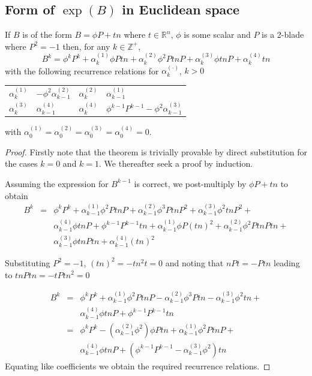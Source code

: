 \subsection{Form of $\exp(B)$ in Euclidean space}
\label{subsec:form}

\begin{lemma}
\label{lem:bk}
If $B$ is of the form $B=\phi P+tn$ where 
$t \in \mathbb{R}^n$, $\phi$ is some scalar and $P$ is a 2-blade 
where $P^2 = -1$ then, for any $k \in \mathbb{Z}^+$, 
\[
B^{k}=\phi^k P^{k}+\alpha _{k}^{(1)}\phi Ptn+
\alpha _{k}^{(2)}\phi^2 PtnP+\alpha _{k}^{(3)}\phi tnP+\alpha _{k}^{(4)}tn
\]
with the following recurrence relations for $\alpha _{k}^{(\cdot )}$,
$k>0$ 

\begin{centering}

\begin{tabular}{r@{$\ =\ $}lr@{$\ =\ $}l}
$\alpha _{k}^{(1)}$ & $- \phi^2 \alpha _{k-1}^{(2)}$ &
$\alpha _{k}^{(2)}$ & $\alpha _{k-1}^{(1)}$\\
$\alpha _{k}^{(3)}$ & $\alpha _{k-1}^{(4)}$ &
$\alpha _{k}^{(4)}$ & $\phi^{k-1}P^{k-1} - \phi^2 \alpha_{k-1}^{(3)}$
\end{tabular}

\end{centering}

\noindent with 
$\alpha _{0}^{(1)}=\alpha _{0}^{(2)}=
\alpha _{0}^{(3)}=\alpha _{0}^{(4)}=0$.
\end{lemma}
\begin{proof}
Firstly note that the theorem is trivially provable by direct 
substitution for the cases $k=0$ and $k=1$. We thereafter seek a 
proof by induction.

Assuming the expression for $B^{k-1}$ is correct, we post-multiply
by $\phi P+tn$ to obtain
\begin{eqnarray*}
B^k & = & \phi^k P^k + \alpha_{k-1}^{(1)}\phi^2 PtnP + 
          \alpha_{k-1}^{(2)}\phi^3 PtnP^2 + \alpha_{k-1}^{(3)}\phi^2 tnP^2 + \\
    &   & \alpha_{k-1}^{(4)}\phi tnP + \phi^{k-1} P^{k-1} tn + \alpha_{k-1}^{(1)}\phi P(tn)^2 +
          \alpha_{k-1}^{(2)}\phi^2 PtnPtn + \\
    &   & \alpha_{k-1}^{(3)}\phi tnPtn +
	  \alpha_{k-1}^{(4)}(tn)^2
\end{eqnarray*}

Substituting $P^2 = -1$, $(tn)^2 = - tn^2t = 0$ and noting that
$nPt = - Ptn$ leading to $tnPtn = - tPtn^2 = 0$

\begin{eqnarray*}
B^k & = & \phi^k P^k + \alpha_{k-1}^{(1)}\phi^2 PtnP -
          \alpha_{k-1}^{(2)}\phi^3 Ptn - \alpha_{k-1}^{(3)}\phi^2 tn + \\
    &   & \alpha_{k-1}^{(4)}\phi tnP + \phi^{k-1} P^{k-1} tn \\
    & = & \phi^k P^k - (\alpha_{k-1}^{(2)}\phi^2)\phi Ptn +
          \alpha_{k-1}^{(1)}\phi^2 PtnP + \\
    &   & \alpha_{k-1}^{(4)}\phi tnP +
	  (\phi^{k-1} P^{k-1}  - \alpha_{k-1}^{(3)}\phi^2) tn
\end{eqnarray*}
Equating like coefficients we obtain the required recurrence relations.
\end{proof}


